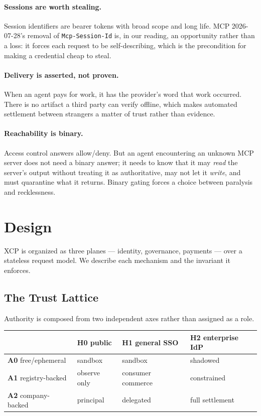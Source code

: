 \documentclass[11pt]{article}
\begin{document}
\paragraph{Sessions are worth stealing.}
Session identifiers are bearer tokens with broad scope and long life. MCP
2026-07-28's removal of \texttt{Mcp-Session-Id} is, in our reading, an
opportunity rather than a loss: it forces each request to be self-describing,
which is the precondition for making a credential cheap to steal.

\paragraph{Delivery is asserted, not proven.}
When an agent pays for work, it has the provider's word that work occurred. There
is no artifact a third party can verify offline, which makes automated settlement
between strangers a matter of trust rather than evidence.

\paragraph{Reachability is binary.}
Access control answers allow/deny. But an agent encountering an unknown MCP
server does not need a binary answer; it needs to know that it may \emph{read}
the server's output without treating it as authoritative, may not let it
\emph{write}, and must quarantine what it returns. Binary gating forces a choice
between paralysis and recklessness.

\section{Design}

XCP is organized as three planes --- identity, governance, payments --- over a
stateless request model. We describe each mechanism and the invariant it
enforces.

\subsection{The Trust Lattice}\label{sec:lattice}

Authority is composed from two independent axes rather than assigned as a role.

\begin{center}
\small
\begin{tabular}{@{}llll@{}}
\toprule
& \textbf{H0} public & \textbf{H1} general SSO & \textbf{H2} enterprise IdP \\
\midrule
\textbf{A0} free/ephemeral   & sandbox      & sandbox     & shadowed \\
\textbf{A1} registry-backed  & observe only & consumer commerce & constrained \\
\textbf{A2} company-backed   & principal    & delegated   & full settlement \\
\bottomrule
\end{tabular}
\end{center}
\end{document}
